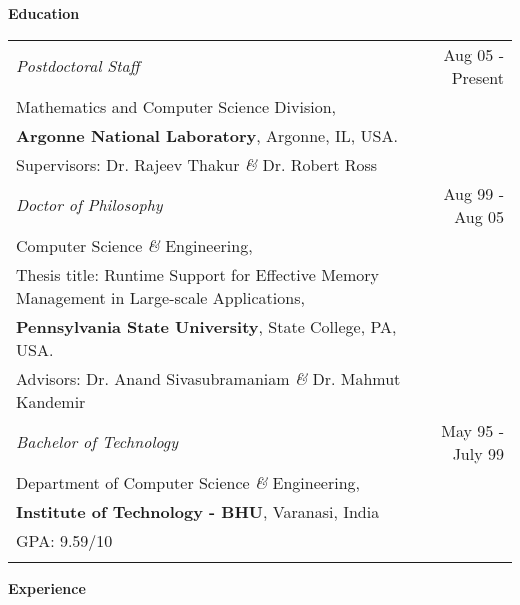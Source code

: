 \documentclass{article}
\begin{document}
  \vspace*{-0.1truein}
  \large \textbf{Education}
  \normalsize
  \vspace*{-0.2truein}
  \begin{center}
  \begin{tabularx}{6.2in}{Xr}
	\emph {Postdoctoral Staff} & Aug 05 - Present \\
	\small
	Mathematics and Computer Science Division, & \\
	\textbf{Argonne National Laboratory}, Argonne, IL, USA. &\\
	Supervisors: Dr. Rajeev Thakur \emph{\&} Dr. Robert Ross & \\
	\normalsize
	\vspace*{0.01in}

	\emph {Doctor of Philosophy} & Aug 99 - Aug 05\\
	\small
	Computer Science \emph{\&} Engineering,& \\
	Thesis title: Runtime Support for Effective Memory Management in Large-scale Applications,&\\
	\textbf{Pennsylvania State University}, State College, PA, USA. &\\
	Advisors: Dr. Anand Sivasubramaniam \emph{\&} Dr. Mahmut Kandemir & \\
	\normalsize
	\vspace*{0.01in}

	\emph {Bachelor of Technology} & May 95 - July 99\\
	\small
	Department of Computer Science \emph{\&} Engineering, &\\
	\textbf{Institute of Technology - BHU}, Varanasi, India & \\
	GPA: 9.59/10 & \\
	\normalsize
  \end{tabularx}
  \end{center}

  \vspace*{-0.05truein}
  \large \textbf{Experience}
  \normalsize
\end{document}
